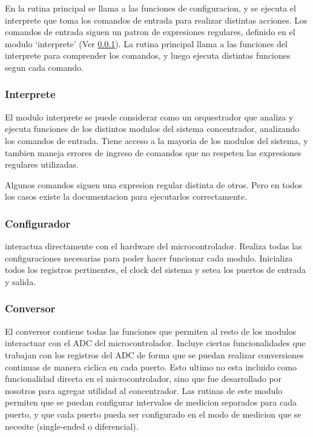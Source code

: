 \documentclass[a4paper]{article}
\begin{document}
En la rutina principal se llama a las funciones de configuracion, y se ejecuta el interprete que toma los comandos de entrada para realizar distintas acciones. Los comandos de entrada siguen un patron de expresiones regulares, definido en el modulo `interprete' (Ver \ref{ssub:interprete}). La rutina principal llama a las funciones del interprete para comprender los comandos, y luego ejecuta distintas funciones segun cada comando.

\subsubsection{Interprete} %
\label{ssub:interprete}

El modulo interprete se puede considerar como un orquestrador que analiza y ejecuta funciones de los distintos modulos del sistema concentrador, analizando los comandos de entrada. Tiene acceso a la mayoria de los modulos del sistema, y tambien maneja errores de ingreso de comandos que no respeten las expresiones regulares utilizadas.

Algunos comandos siguen una expresion regular distinta de otros. Pero en todos los casos existe la documentacion para ejecutarlos correctamente.

\subsubsection{Configurador} %
\label{ssub:configurador}

interactua directamente con el hardware del microcontrolador. Realiza todas las configuraciones necesarias para poder hacer funcionar cada modulo. Inicializa todos los registros pertinentes, el clock del sistema y setea los puertos de entrada y salida.

\subsubsection{Conversor} %
\label{ssub:conversor}

El conversor contiene todas las funciones que permiten al resto de los modulos interactuar con el ADC del microcontrolador. Incluye ciertas funcionalidades que trabajan con los registros del ADC de forma que se puedan realizar conversiones continuas de manera ciclica en cada puerto. Esto ultimo no esta incluido como funcionalidad directa en el microcontrolador, sino que fue desarrollado por nosotros para agregar utilidad al concentrador. 
Las rutinas de este modulo permiten que se puedan configurar intervalos de medicion separados para cada puerto, y que cada puerto pueda ser configurado en el modo de medicion que se necesite (single-ended o diferencial).
\end{document}

